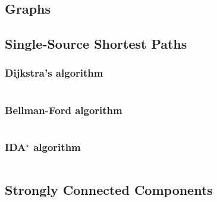 \documentclass[8pt,a4paper,landscape,oneside]{amsart}
\newcommand{\code}[1]{\inputminted[fontsize=\normalsize,baselinestretch=1]{cpp}{_code/#1}}
\newif\ifverbose
\begin{document}
\begin{multicols*}{3}
\section{Graphs}
    \subsection{Single-Source Shortest Paths}
        \subsubsection{Dijkstra's algorithm}
            \ifverbose
            An implementation of Dijkstra's algorithm. It runs in
            $\Theta(|E|\log{|V|})$ time.
            \fi
            \code{graph/dijkstra.cpp}

        \subsubsection{Bellman-Ford algorithm}
            \ifverbose
            The Bellman-Ford algorithm solves the single-source shortest paths
            problem in $O(|V||E|)$ time. It is slower than Dijkstra's
            algorithm, but it works on graphs with negative edges and has the
            ability to detect negative cycles, neither of which Dijkstra's
            algorithm can do.
            \fi
            \code{graph/bellman_ford.cpp}

        \subsubsection{IDA$^\star$ algorithm}
            \code{graph/idastar.cpp}

    \ifverbose
    \subsection{All-Pairs Shortest Paths}
        \subsubsection{Floyd-Warshall algorithm}
            The Floyd-Warshall algorithm solves the all-pairs shortest paths
            problem in $O(|V|^3)$ time.
            \code{graph/floyd_warshall.cpp}
    \fi

    \subsection{Strongly Connected Components}

\end{multicols*}
\end{document}
